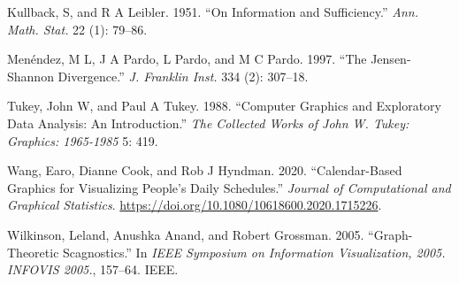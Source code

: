 \documentclass[
]{article}
\begin{document}
\leavevmode\hypertarget{ref-Kullback1951-jy}{}%
Kullback, S, and R A Leibler. 1951. ``On Information and Sufficiency.'' \emph{Ann. Math. Stat.} 22 (1): 79--86.

\leavevmode\hypertarget{ref-Menendez1997-in}{}%
Menéndez, M L, J A Pardo, L Pardo, and M C Pardo. 1997. ``The Jensen-Shannon Divergence.'' \emph{J. Franklin Inst.} 334 (2): 307--18.

\leavevmode\hypertarget{ref-tukey1988computer}{}%
Tukey, John W, and Paul A Tukey. 1988. ``Computer Graphics and Exploratory Data Analysis: An Introduction.'' \emph{The Collected Works of John W. Tukey: Graphics: 1965-1985} 5: 419.

\leavevmode\hypertarget{ref-wang2020calendar}{}%
Wang, Earo, Dianne Cook, and Rob J Hyndman. 2020. ``Calendar-Based Graphics for Visualizing People's Daily Schedules.'' \emph{Journal of Computational and Graphical Statistics}. \url{https://doi.org/10.1080/10618600.2020.1715226}.

\leavevmode\hypertarget{ref-wilkinson2005graph}{}%
Wilkinson, Leland, Anushka Anand, and Robert Grossman. 2005. ``Graph-Theoretic Scagnostics.'' In \emph{IEEE Symposium on Information Visualization, 2005. INFOVIS 2005.}, 157--64. IEEE.
\end{document}
